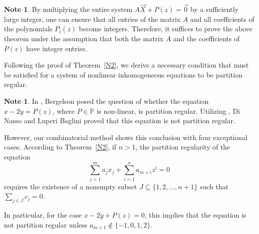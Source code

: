 \documentclass{article}
\theoremstyle{Theorem}
\theoremstyle{definition}
\newtheorem{note}[thm]{Note}
\begin{document}
\begin{note}
    By multiplying the entire system \( A\vec{X} + P(z) = \vec{0} \) by a sufficiently large integer, one can ensure that all entries of the matrix \( A \) and all coefficients of the polynomials \( P_i(z) \) become integers. Therefore, it suffices to prove the above theorem under the assumption that both the matrix \( A \) and the coefficients of \( P(z) \) have integer entries.
\end{note}


Following the proof of Theorem~\ref{N2}, we derive a necessary condition that must be satisfied for a system of nonlinear inhomogeneous equations to be partition regular.

    

\begin{note}
In \cite{update}, Bergelson posed the question of whether the equation \( x - 2y = P(z) \), where \( P \in \mathbb{P} \) is non-linear, is partition regular. Utilizing \cite[Example~3.15]{NB}, Di Nasso and Luperi Baglini proved that this equation is not partition regular. 

However, our combinatorial method shows this conclusion with four exceptional cases. According to Theorem~\ref{N2}, if \( n > 1 \), the partition regularity of the equation
\[
\sum_{j=1}^{m} a_j x_j + \sum_{i=1}^{n} a_{m+i} z^i = 0
\]
requires the existence of a nonempty subset \( J \subseteq \{1, 2, \dots, n+1\} \) such that \( \sum_{j \in J} c_j = 0 \). 

In particular, for the case \( x - 2y + P(z) = 0 \), this implies that the equation is not partition regular unless \( a_{m+1} \notin \{-1,0, 1, 2\} \). 

\end{note}
\end{document}
